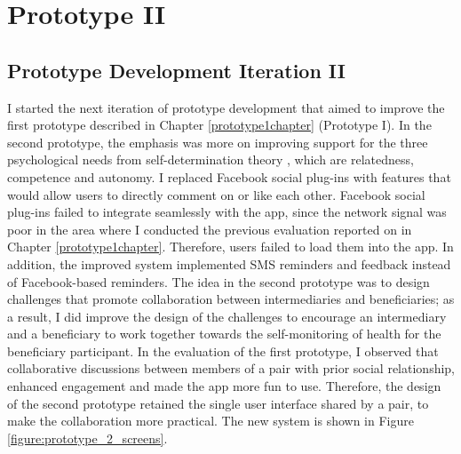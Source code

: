 
\chapter{Prototype II} %

\label{prototype2chapter} %


\section{Prototype Development Iteration II}\label{prototype2descr}
I started the next iteration of prototype development that aimed to improve the first prototype described in Chapter \ref{prototype1chapter} (Prototype I). In the second prototype, the emphasis was more on improving support for the three psychological needs from self-determination theory \citep{ryan2000:self}, which are relatedness, competence and autonomy. I replaced Facebook social plug-ins with features that would allow users to directly comment on or like each other. Facebook social plug-ins failed to integrate seamlessly with the app, since the network signal was poor in the area where I conducted the previous evaluation reported on in Chapter \ref{prototype1chapter}. Therefore, users failed to load them into the app. In addition, the improved system implemented SMS reminders and feedback instead of Facebook-based reminders. The idea in the second prototype was to design challenges that promote collaboration between intermediaries and beneficiaries; as a result, I did improve the design of the challenges to encourage an intermediary and a beneficiary to work together towards the self-monitoring of health for the beneficiary participant. In the evaluation of the first prototype, I observed that collaborative discussions between members of a pair  with prior social relationship, enhanced engagement and made the app more fun to use. Therefore, the design of the second prototype retained the single user interface shared by a pair, to make the collaboration more practical. The new system is shown in Figure \ref{figure:prototype_2_screens}.

